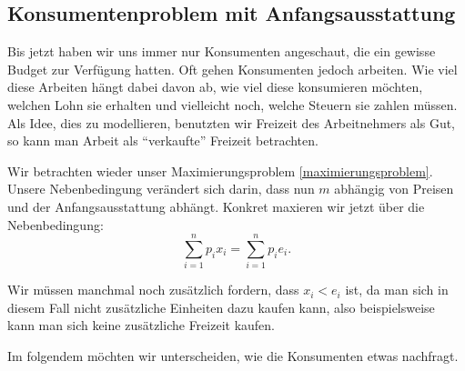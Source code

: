\subsection{Konsumentenproblem mit Anfangsausstattung}
Bis jetzt haben wir uns immer nur Konsumenten angeschaut, die ein gewisse Budget zur Verfügung hatten.
Oft gehen Konsumenten jedoch arbeiten. Wie viel diese Arbeiten hängt dabei davon ab, wie viel diese konsumieren möchten, welchen Lohn sie erhalten und vielleicht noch, welche Steuern sie zahlen müssen.
Als Idee, dies zu modellieren, benutzten wir Freizeit des Arbeitnehmers als Gut, so kann man Arbeit als \enquote{verkaufte} Freizeit betrachten.
\begin{construction}
	Wir betrachten wieder unser Maximierungsproblem \ref{maximierungsproblem}. Unsere Nebenbedingung verändert sich darin, dass nun $m$ abhängig von Preisen und der Anfangsausstattung abhängt.
	Konkret maxieren wir jetzt über die Nebenbedingung:
	\[
		\sum_{i=1}^{n} p_i x_{i} = \sum_{i=1}^{n} p_i e_i
		.\]

\end{construction}

\begin{remark}
	Wir müssen manchmal noch zusätzlich fordern, dass $x_i < e_i$ ist, da man sich in diesem Fall nicht zusätzliche Einheiten dazu kaufen kann, also beispielsweise kann man sich keine zusätzliche Freizeit kaufen.
\end{remark}

Im folgendem möchten wir unterscheiden, wie die Konsumenten etwas nachfragt.

